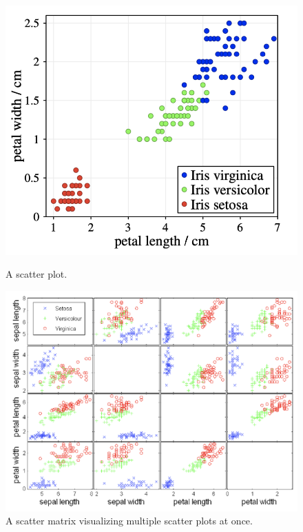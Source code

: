 \begin{figure}[ht]
    \centering
    \begin{minipage}[b]{0.45\textwidth}
        \includegraphics[width=\textwidth]{img/scatter plot.png}
        \caption{A scatter plot.}
    \end{minipage}
    \hfill
    \begin{minipage}[b]{0.47\textwidth}
        \includegraphics[width=\textwidth]{img/scatter matrix.png}
        \caption{A scatter matrix visualizing multiple scatter plots at once.}
    \end{minipage}
\end{figure}

